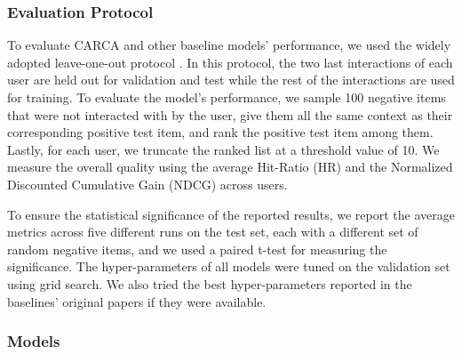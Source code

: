 \documentclass[sigconf,natbib=true]{acmart}
\begin{document}
\subsubsection{Evaluation Protocol}
To evaluate CARCA and other baseline models' performance, we used the widely adopted leave-one-out protocol \cite{kang2018self,wu2020sse,ZhouWZZWZWW20,he2016vbpr,ijcai2019650,wang2020time}. In this protocol, the two last interactions of each user are held out for validation and test while the rest of the interactions are used for training. To evaluate the model's performance, we sample 100 negative items that were not interacted with by the user, give them all the same context as their corresponding positive test item, and rank the positive test item among them.
Lastly, for each user, we truncate the ranked list at a threshold value of 10. We measure the overall quality using the average Hit-Ratio (HR) and the Normalized Discounted Cumulative Gain (NDCG) across users.

To ensure the statistical significance of the reported results, we report the average metrics across five different runs on the test set, each with a different set of random negative items, and we used a paired t-test for measuring the significance. The hyper-parameters of all models were tuned on the validation set using grid search. We also tried the best hyper-parameters reported in the baselines' original papers if they were available. 


\subsubsection{Models}
\end{document}
